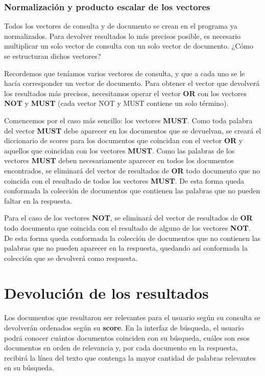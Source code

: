 \documentclass[12pt, letterpaper]{article}
\begin{document}
        \newpage
        \subsubsection{Normalización y producto escalar de los vectores}
        Todos los vectores de consulta y de documento se crean en el programa ya normalizados. Para devolver resultados lo más precisos posible, es necesario multiplicar un solo vector de consulta con un solo vector de documento. ¿Cómo se estructuran dichos vectores?
       
        Recordemos que teníamos varios vectores de consulta, y que a cada uno se le hacía corresponder un vector de documento. Para obtener el vector que devolverá los resultados más precisos, necesitamos operar el vector \textbf{OR} con los vectores \textbf{NOT} y \textbf{MUST} (cada vector NOT y MUST contiene un solo término).
        
        Comencemos por el caso más sencillo: los vectores \textbf{MUST}. Como toda palabra del vector \textbf{MUST} debe aparecer en los documentos que se devuelvan, se creará el diccionario de scores para los documentos que coincidan con el vector \textbf{OR} y aquellos que coincidan con los vectores \textbf{MUST}. Como las palabras de los vectores \textbf{MUST} deben necesariamente aparecer en todos los documentos encontrados, se eliminará del vector de resultados de \textbf{OR} todo documento que no coincida con el resultado de todos los vectores \textbf{MUST}. De esta forma queda conformada la colección de documentos que contienen las palabras que no pueden faltar en la respuesta.
       
        Para el caso de los vectores \textbf{NOT}, se eliminará del vector de resultados de \textbf{OR} todo documento que coincida con el resultado de alguno de los vectores \textbf{NOT}. De esta forma queda conformada la colección de documentos que no contienen las palabras que no pueden aparecer en la respuesta, quedando así conformada la colección que se devolverá como respuesta.

    \section{Devolución de los resultados}
    Los documentos que resultaron ser relevantes para el usuario según su consulta se devolverán ordenados según su \textbf{score}. En la interfaz de búsqueda, el usuario podrá conocer cuántos documentos coinciden con su búsqueda, cuáles son esos documentos en orden de relevancia y, por cada documento en la respuesta, recibirá la línea del texto que contenga la mayor cantidad de palabras relevantes en su búsqueda.
\end{document}
